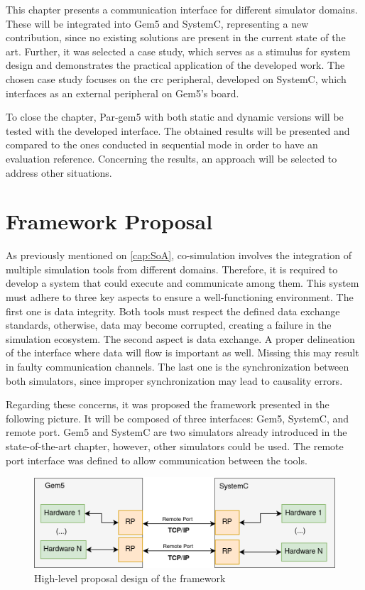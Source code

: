
This chapter presents a communication interface for different simulator domains. These will be integrated into Gem5 and SystemC, representing 
a new contribution, since no existing solutions are present in the current state of the art. Further, it was selected a 
case study, which serves as a stimulus for system design and demonstrates 
the practical application of the developed work. The chosen case study focuses on the \gls{crc} peripheral, developed on SystemC, which interfaces 
as an external peripheral on Gem5's board. 

To close the chapter, Par-gem5 with both static and dynamic versions will be tested with the developed interface. 
The obtained results will be presented and compared to the ones conducted in sequential mode in order to have an evaluation reference. 
Concerning the results, an approach will be selected to address other situations. 

\section{Framework Proposal}

As previously mentioned on \autoref{cap:SoA}, co-simulation involves the integration of multiple simulation tools from different
domains. Therefore, it is required to develop a system that could execute and communicate among them. This system must adhere to three key 
aspects to ensure a well-functioning environment. The first one is data integrity. Both tools must respect the defined data exchange standards, 
otherwise, data may become corrupted, creating a failure in the simulation ecosystem. The second aspect is data exchange. A proper delineation of the 
interface where data will flow is important as well. Missing this may result in faulty communication channels. The last one is the synchronization 
between both simulators, since improper synchronization may lead to causality errors.

Regarding these concerns, it was proposed the framework presented in the following picture. It will be composed of three interfaces: Gem5, SystemC, 
and remote port. Gem5 and SystemC are two simulators already introduced in the state-of-the-art chapter, however, other simulators could be used. 
The remote port interface was defined to allow communication between the tools.

\begin{figure}[H]
	\centering
 	\includegraphics[width=0.8\linewidth]{Images/CoSimDesignSimplified.png}
 	\caption{High-level proposal design of the framework}
	 \label{fig_CoSimDesignSimplified}
\end{figure}

